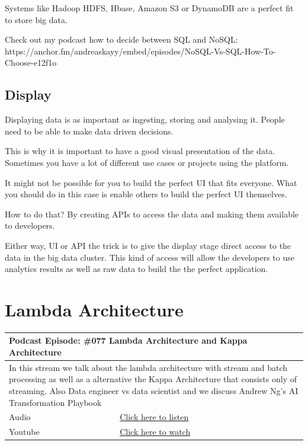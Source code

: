 \documentclass[12pt, numbers=noenddot]{scrreprt} %
\begin{document}
Systems like Hadoop HDFS, Hbase, Amazon S3 or DynamoDB are a perfect fit to store big data.

Check out my podcast how to decide between SQL and NoSQL: https://anchor.fm/andreaskayy/embed/episodes/NoSQL-Vs-SQL-How-To-Choose-e12f1o

\section{Display}
Displaying data is as important as ingesting, storing and analysing it. People need to be able to make data driven decisions.

This is why it is important to have a good visual presentation of the data. Sometimes you have a lot of different use cases or projects using the platform.

It might not be possible for you to build the perfect UI that fits everyone. What you should do in this case is enable others to build the perfect UI themselves.

How to do that? By creating APIs to access the data and making them available to developers.

Either way, UI or API the trick is to give the display stage direct access to the data in the big data cluster. This kind of access will allow the developers to use analytics results as well as raw data to build the the perfect application.

\chapter{ Lambda Architecture}

\begin{table}[h]
\begin{tabular}{ll}
\hline
\multicolumn{2}{l}{\textbf{Podcast Episode:} \#077 Lambda Architecture and Kappa Architecture} \\ \hline
\multicolumn{2}{p{15cm}}{In this stream we talk about the lambda architecture with stream and batch processing as well as a alternative the Kappa Architecture that consists only of streaming. Also Data engineer vs data scientist and we discuss Andrew Ng's AI Transformation Playbook}         \\ \hline
\multicolumn{1}{l|}{Audio}     & \href{https://anchor.fm/andreaskayy/episodes/077-Lambda--Kappa-Architecture-e45j0r}{Click here to listen}   \\
\multicolumn{1}{l|}{Youtube}   & \href{https://youtu.be/iUOQPyHN9-0}{Click here to watch}   \\ \hline
\end{tabular}
\end{table}
\end{document}
